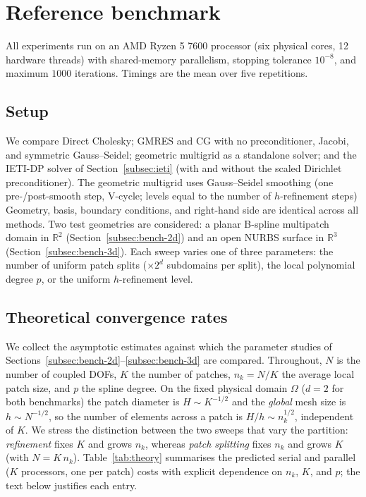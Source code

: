 \documentclass{article}
\newcommand{\R}{\mathbb{R}}
\theoremstyle{plain}
\numberwithin{equation}{section}
\begin{document}
\section{Reference benchmark}
\label{sec:reference-benchmark}

All experiments run on an AMD Ryzen 5 7600 processor (six physical cores,
12 hardware threads) with shared-memory parallelism, stopping tolerance
$10^{-8}$, and maximum $1000$ iterations.
Timings are the mean over five repetitions.

\subsection{Setup} \label{subsec:bench-setup}

We compare Direct Cholesky; GMRES and CG with no preconditioner, Jacobi, and symmetric Gauss--Seidel;
geometric multigrid as a standalone solver; and the IETI-DP solver of
Section~\ref{subsec:ieti} (with and without the scaled Dirichlet preconditioner).
The geometric multigrid uses Gauss--Seidel smoothing (one pre-/post-smooth step,
V-cycle; levels equal to the number of $h$-refinement steps)
Geometry, basis, boundary
conditions, and right-hand side are identical across all methods.
Two test geometries are considered: a planar B-spline multipatch domain in $\R^2$
(Section~\ref{subsec:bench-2d}) and an open NURBS surface in $\R^3$
(Section~\ref{subsec:bench-3d}).
Each sweep varies one of three parameters: the number of uniform patch splits
($\times 2^d$ subdomains per split), the local polynomial degree $p$, or the
uniform $h$-refinement level.


\subsection{Theoretical convergence rates}
\label{subsec:theory}

We collect the asymptotic estimates against which the parameter studies of
Sections~\ref{subsec:bench-2d}--\ref{subsec:bench-3d} are compared.
Throughout, $N$ is the number of coupled DOFs, $K$ the number of patches,
$n_k = N/K$ the average local patch size, and $p$ the spline degree.
On the fixed physical domain $\Omega$ ($d=2$ for both benchmarks) the patch
diameter is $H\sim K^{-1/2}$ and the \emph{global} mesh size is $h\sim N^{-1/2}$,
so the number of elements across a patch is $H/h\sim n_k^{1/2}$, independent
of $K$. We stress the distinction between the two sweeps that vary the
partition: \emph{refinement} fixes $K$ and grows $n_k$, whereas \emph{patch
    splitting} fixes $n_k$ and grows $K$ (with $N=K\,n_k$). Table~\ref{tab:theory} summarises the predicted serial and parallel
($K$ processors, one per patch) costs with explicit dependence on $n_k$, $K$,
and $p$; the text below justifies each entry.
\end{document}
